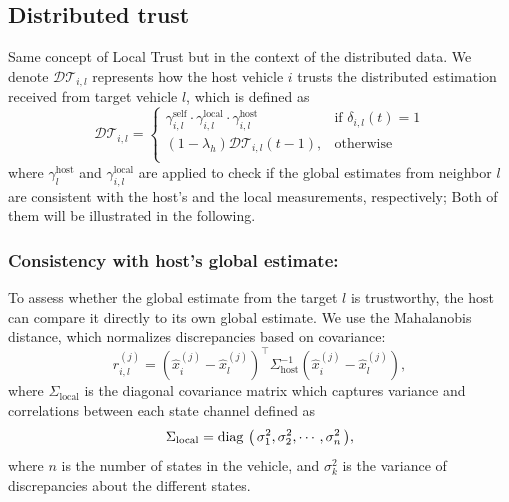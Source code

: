 \documentclass{ifacconf}
\def\diag#1{\mathop{{\rm diag}\,\left(\,#1\,\right)}}
\def\DT{\mathcal{DT}} %
\begin{document}


\subsection{Distributed trust}
\vspace*{-0.3cm}
Same concept of Local Trust but in the context of the distributed data. We denote $\DT_{i,l}$ represents how the host vehicle $i$ trusts the distributed estimation received from target vehicle $l$, which is defined as
\begin{equation}
        \DT_{i,l}  = \begin{cases}
       \gamma_{i,l}^{\text{self}} \cdot \gamma_{i,l}^{\text{local}} \cdot
        \gamma_{i,l}^{\text{host}}   &  \text{if } \delta_{i,l}(t) = 1 \\
        (1 - \lambda_h)\DT_{i,l}(t-1), & \text{otherwise} \\
    \end{cases}
\end{equation}
where $\gamma_{l}^{\text{host}}$ and $\gamma_{i,l}^{\text{local}}$ are applied to check if the global estimates from neighbor $l$ are consistent with the host's and the local measurements, respectively; 
Both of them will be illustrated in the following. 


\subsubsection{Consistency with host's global estimate:}
To assess whether the global estimate from the target $l$ is trustworthy, the host can compare it directly to its own global estimate. 
We use the Mahalanobis distance, which normalizes discrepancies based on covariance:
\begin{equation}
    r_{i,l}^{(j)} = \left( \hat{x}_i^{(j)} - \hat{x}_l^{(j)} \right)^{\top} \Sigma_{\text{host}}^{-1} \left( \hat{x}_i^{(j)} - \hat{x}_l^{(j)} \right), 
    \label{eq_dis_glo}
\end{equation}
where $\Sigma_{\text{local}}$ is the diagonal covariance matrix  which captures variance and correlations between each state channel defined as 
\begin{equation}
\Sigma_{\text{local}} = \diag{\sigma^2_1, \sigma^2_2, \cdots , \sigma^2_n},
\end{equation}
where $n$ is the number of states in the vehicle, and $\sigma^2_k$ is  the variance of discrepancies about the different states. 
\end{document}
